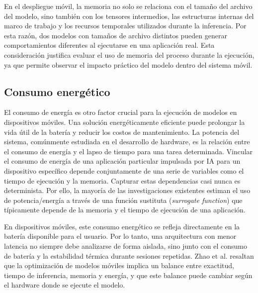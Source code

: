 En el despliegue móvil, la memoria no solo se relaciona con el tamaño del archivo del modelo, sino también con los tensores intermedios,
las estructuras internas del marco de trabajo y los recursos temporales utilizados durante la inferencia. Por esta razón, dos modelos con tamaños de
archivo distintos pueden generar comportamientos diferentes al ejecutarse en una aplicación real. Esta consideración justifica evaluar el
uso de memoria del proceso durante la ejecución, ya que permite observar el impacto práctico del modelo dentro del sistema móvil.

\subsection{Consumo energético}
El consumo de energía es otro factor crucial para la ejecución de modelos en dispositivos móviles. Una solución energéticamente eficiente puede prolongar
la vida útil de la batería y reducir los costos de mantenimiento. La potencia del sistema, comúnmente estudiada en el desarrollo de hardware,
es la relación entre el consumo de energía y el lapso de tiempo para una tarea determinada.
Vincular el consumo de energía de una aplicación particular impulsada por IA para un dispositivo específico depende conjuntamente de una
serie de variables como el tiempo de ejecución y la memoria. Capturar estas dependencias casi nunca es determinista.
Por ello, la mayoría de las investigaciones existentes estiman el uso de potencia/energía a través de una función sustituta (\textit{surrogate function})
que típicamente depende de la memoria y el tiempo de ejecución de una aplicación.

En dispositivos móviles, este consumo energético se refleja directamente en la batería disponible para el usuario. Por lo tanto, una
arquitectura con menor latencia no siempre debe analizarse de forma aislada, sino junto con el consumo de batería y la estabilidad térmica
durante sesiones repetidas. Zhao et al. \cite{zhao2022survey} resaltan que la optimización de modelos móviles implica un balance entre
exactitud, tiempo de inferencia, memoria y energía, y que este balance puede cambiar según el hardware donde se ejecute el modelo.
